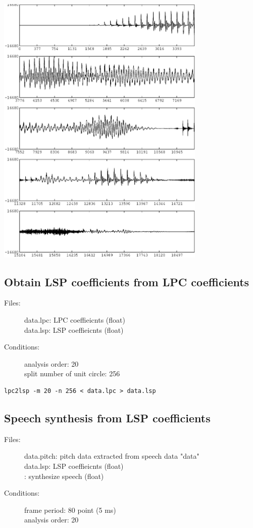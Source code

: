 \documentclass[a4paper]{article}
\begin{document}
\includegraphics[width=10cm]{data.par.syn.gwave.eps}

\subsection{Obtain LSP coefficients from LPC coefficients}
\begin{description}
\item[Files:]
   data.lpc: LPC coeffieicnts (float)\\
   data.lsp: LSP coeffieicnts (float)
\item[Conditions:]
  analysis order: 20\\
  split number of unit circle: 256
\end{description}

\begin{verbatim}
lpc2lsp -m 20 -n 256 < data.lpc > data.lsp
\end{verbatim}

\subsection{Speech synthesis from LSP coefficients}

\begin{description}
\item[Files:]
  data.pitch: pitch data extracted from speech data "data"\\
  data.lsp: LSP coeffieicnts (float)\\
  : 
  synthesize speech (float)
\item[Conditions:]
  frame period: 80 point (5 ms)\\
  analysis order: 20
\end{description}
\end{document}
